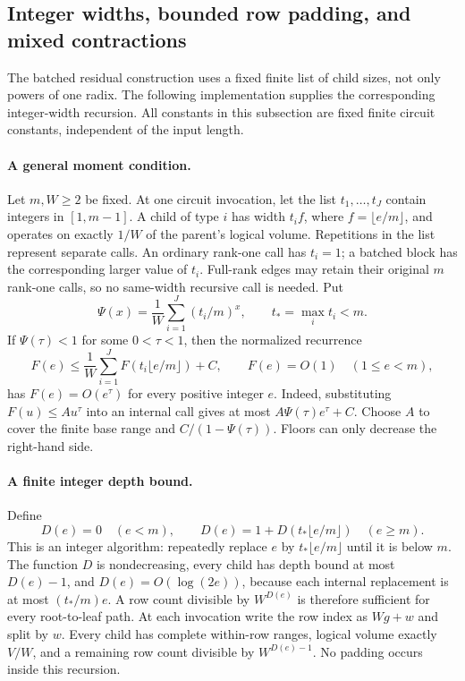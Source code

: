 \subsection{Integer widths, bounded row padding, and mixed contractions}
\label{sec:mixed-width-rows}

The batched residual construction uses a fixed finite list of child sizes,
not only powers of one radix.  The following implementation supplies the
corresponding integer-width recursion.  All constants in this subsection
are fixed finite circuit constants, independent of the input length.

\paragraph{A general moment condition.}
Let $m,W\ge2$ be fixed.  At one circuit invocation, let the list
$t_1,\ldots,t_J$ contain integers in $[1,m-1]$.  A child of type $i$ has
width $t_i f$, where $f=\lfloor e/m\rfloor$, and operates on exactly
$1/W$ of the parent's logical volume.  Repetitions in the list represent
separate calls.  An ordinary rank-one call has $t_i=1$; a batched block
has the corresponding larger value of $t_i$.  Full-rank edges may retain
their original $m$ rank-one calls, so no same-width recursive call is
needed.  Put
\[
 \Psi(x)=\frac1W\sum_{i=1}^J(t_i/m)^x,
 \qquad t_* = \max_i t_i <m.
\]
If $\Psi(\tau)<1$ for some $0<\tau<1$, then the normalized recurrence
\[
 F(e)\le \frac1W\sum_{i=1}^J F(t_i\lfloor e/m\rfloor)+C,
 \qquad F(e)=O(1)\quad(1\le e<m),
\]
has $F(e)=O(e^\tau)$ for every positive integer $e$.  Indeed, substituting
$F(u)\le A u^\tau$ into an internal call gives at most
$A\Psi(\tau)e^\tau+C$.  Choose $A$ to cover the finite base range and
$C/(1-\Psi(\tau))$.  Floors can only decrease the right-hand side.

\paragraph{A finite integer depth bound.}
Define
\[
 D(e)=0\quad(e<m),\qquad
 D(e)=1+D(t_*\lfloor e/m\rfloor)\quad(e\ge m).
\]
This is an integer algorithm: repeatedly replace $e$ by
$t_*\lfloor e/m\rfloor$ until it is below $m$.  The function $D$ is
nondecreasing, every child has depth bound at most $D(e)-1$, and
$D(e)=O(\log(2e))$, because each internal replacement is at most
$(t_*/m)e$.  A row count divisible by $W^{D(e)}$ is therefore sufficient
for every root-to-leaf path.  At each invocation write the row index as
$Wg+w$ and split by $w$.  Every child has complete within-row ranges,
logical volume exactly $V/W$, and a remaining row count divisible by
$W^{D(e)-1}$.  No padding occurs inside this recursion.

